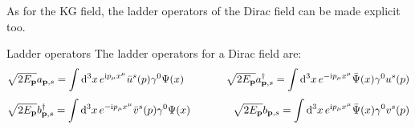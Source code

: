 As for the KG field, the ladder operators of the Dirac field can be made explicit too.

\begin{proposition}{Ladder operators}{}
  The ladder operators for a Dirac field are:
  \begin{equation}
    \sqrt{2E_{\mathbf{p}}} a_{\mathbf{p},s} = \int \mathrm{d}^3x\, e^{\mathrm{i} p_\mu x^\mu} \bar{u}^s(p) \gamma^0 \Psi(x)
    \qquad \qquad
    \sqrt{2E_{\mathbf{p}}} a_{\mathbf{p},s}^\dagger = \int \mathrm{d}^3x\, e^{-\mathrm{i} p_\mu x^\mu} \bar{\Psi}(x) \gamma^0 u^s(p)
    \label{eq:dirac-ladd-op-a}
  \end{equation}
  \begin{equation}
    \sqrt{2E_{\mathbf{p}}} b_{\mathbf{p},s}^\dagger = \int \mathrm{d}^3x\, e^{-\mathrm{i} p_\mu x^\mu} \bar{v}^s(p) \gamma^0 \Psi(x)
    \qquad \qquad
    \sqrt{2E_{\mathbf{p}}} b_{\mathbf{p},s} = \int \mathrm{d}^3x\, e^{\mathrm{i} p_\mu x^\mu} \bar{\Psi}(x) \gamma^0 v^s(p)
    \label{eq:dirac-ladd-op-b}
  \end{equation}
\end{proposition}

